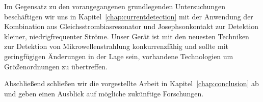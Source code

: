 {\noindent \newline
Im Gegensatz zu den vorangegangenen grundlegenden Untersuchungen beschäftigen wir uns in Kapitel~\ref{chap:currentdetection} mit der Anwendung der Kombination aus Gleichsstrombiasresonator und Josephsonkontakt zur Detektion kleiner, niedrigfrequenter Ströme.
%
Unser Gerät ist mit den neuesten Techniken zur Detektion von Mikrowellenstrahlung konkurrenzfähig und sollte mit geringfügigen Änderungen in der Lage sein, vorhandene Technologien um Größenordnungen zu übertreffen.

\noindent \newline
Abschließend schließen wir die vorgestellte Arbeit in Kapitel~\ref{chap:conclusion} ab und geben einen Ausblick auf mögliche zukünftige Forschungen.
}

\afterpage{\pagecolor{none}}